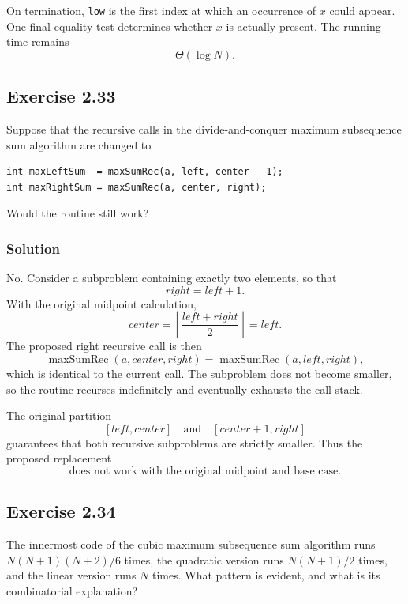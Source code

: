 \documentclass[12pt,a4paper]{article}
\begin{document}
On termination, \texttt{low} is the first index at which an occurrence
of $x$ could appear. One final equality test determines whether $x$ is
actually present. The running time remains
\[
\boxed{\Theta(\log N)}.
\]

\subsection*{\color{sectionnavy}Exercise 2.33}

\noindent
Suppose that the recursive calls in the divide-and-conquer maximum
subsequence sum algorithm are changed to

\begin{lstlisting}
int maxLeftSum  = maxSumRec(a, left, center - 1);
int maxRightSum = maxSumRec(a, center, right);
\end{lstlisting}

Would the routine still work?

\subsubsection*{\color{sectionnavy}Solution}

No. Consider a subproblem containing exactly two elements, so that
\[
\mathit{right}=\mathit{left}+1.
\]
With the original midpoint calculation,
\[
\mathit{center}
=\left\lfloor\frac{\mathit{left}+\mathit{right}}2\right\rfloor
=\mathit{left}.
\]
The proposed right recursive call is then
\[
\operatorname{maxSumRec}(a,\mathit{center},\mathit{right})
=\operatorname{maxSumRec}(a,\mathit{left},\mathit{right}),
\]
which is identical to the current call. The subproblem does not become
smaller, so the routine recurses indefinitely and eventually exhausts
the call stack.

The original partition
\[
[\mathit{left},\mathit{center}]
\quad\text{and}\quad
[\mathit{center}+1,\mathit{right}]
\]
guarantees that both recursive subproblems are strictly smaller. Thus
the proposed replacement
\[
\boxed{\text{does not work with the original midpoint and base case.}}
\]

\subsection*{\color{sectionnavy}Exercise 2.34}

\noindent
The innermost code of the cubic maximum subsequence sum algorithm runs
$N(N+1)(N+2)/6$ times, the quadratic version runs $N(N+1)/2$ times,
and the linear version runs $N$ times. What pattern is evident, and what
is its combinatorial explanation?
\end{document}
